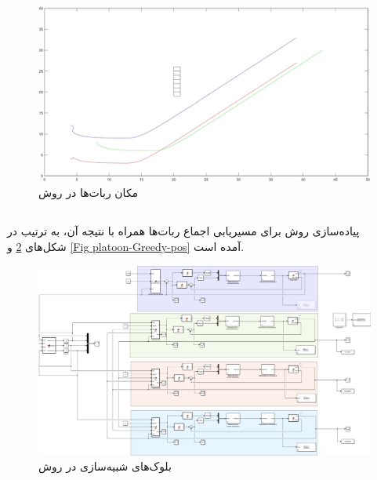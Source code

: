 \begin{figure}[!h]
	\centering
	\includegraphics[scale=0.2]{Images/platoon-BFS-pos.jpg}
	\caption{مکان ربات‌ها در روش }\label{Fig platoon-BSF-pos}
\end{figure}

\newpage
\subsection{}
پیاده‌سازی روش  برای مسیریابی اجماع ربات‌ها همراه با نتیجه‌ آن، به ترتیب در شکل‌های \ref{Fig platoon-Greedy-simulink} و \ref{Fig platoon-Greedy-pos} آمده است.
\begin{figure}[!h]
	\centering
	\includegraphics[scale=0.22]{Images/platoon-Greedy-simulink.png}
	\caption{بلوک‌های شبیه‌سازی در روش }\label{Fig platoon-Greedy-simulink}
\end{figure}

